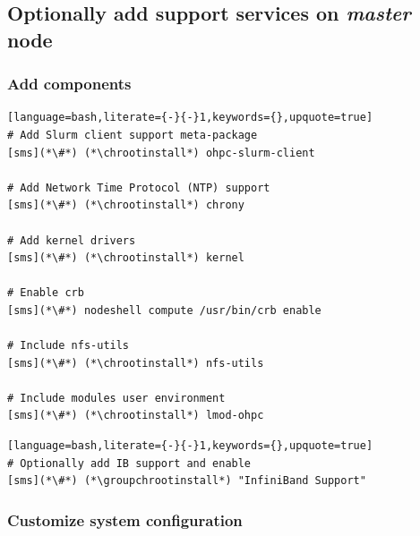 \documentclass[letterpaper]{article}
\newcommand{\chrootinstall}{nodeshell compute dnf -y install}
\newcommand{\groupchrootinstall}{nodeshell compute dnf -y groupinstall}
\begin{document}
\subsection{Optionally add \OmniPath{} support services on {\em master} node} \label{sec:add_opa}


\vspace*{0.2cm}
\subsubsection{Add \OHPC{} components} \label{sec:add_components}


\begin{lstlisting}[language=bash,literate={-}{-}1,keywords={},upquote=true]
# Add Slurm client support meta-package
[sms](*\#*) (*\chrootinstall*) ohpc-slurm-client

# Add Network Time Protocol (NTP) support
[sms](*\#*) (*\chrootinstall*) chrony

# Add kernel drivers
[sms](*\#*) (*\chrootinstall*) kernel

# Enable crb
[sms](*\#*) nodeshell compute /usr/bin/crb enable

# Include nfs-utils
[sms](*\#*) (*\chrootinstall*) nfs-utils

# Include modules user environment
[sms](*\#*) (*\chrootinstall*) lmod-ohpc
\end{lstlisting}



\begin{lstlisting}[language=bash,literate={-}{-}1,keywords={},upquote=true]
# Optionally add IB support and enable
[sms](*\#*) (*\groupchrootinstall*) "InfiniBand Support"
\end{lstlisting}

\vspace*{-0.25cm}
\subsubsection{Customize system configuration} \label{sec:master_customization}

\end{document}
